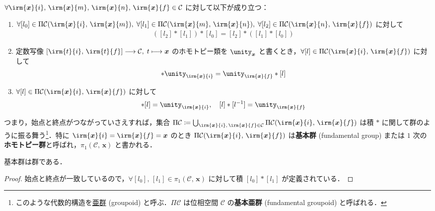 \documentclass[TQFT_main]{subfiles}
\begin{document}
\begin{mylem}[label=lem:1-1groupoid]{}
    $\forall \irm{\bm{x}}{i},\, \irm{\bm{x}}{m},\, \irm{\bm{x}}{n},\, \irm{\bm{x}}{f} \in \mathcal{C}$ に対して以下が成り立つ：
    \begin{enumerate}
        \item $\forall [l_0]\in \Pi \mathcal{C} (\irm{\bm{x}}{i},\, \irm{\bm{x}}{m}),\; \forall [l_1] \in \Pi \mathcal{C} (\irm{\bm{x}}{m},\, \irm{\bm{x}}{n}),\; \forall [l_2] \in \Pi \mathcal{C} (\irm{\bm{x}}{n},\, \irm{\bm{x}}{f})$ に対して
        \begin{align}
            ([l_2] * [l_1]) * [l_0] = [l_2] * ([l_1] * [l_0])
        \end{align}
        \item 定数写像 $[\irm{t}{i},\, \irm{t}{f}] \lto \mathcal{C},\; t \lmto \bm{x}$ のホモトピー類を $\unity_{\bm{x}}$ と書くとき，$\forall [l] \in \Pi \mathcal{C} (\irm{\bm{x}}{i},\, \irm{\bm{x}}{f})$ に対して
        \begin{align}
            [l] * \unity_{\irm{\bm{x}}{i}} = \unity_{\irm{\bm{x}}{f}} * [l]
        \end{align}
        \item $\forall [l] \in \Pi \mathcal{C} (\irm{\bm{x}}{i},\, \irm{\bm{x}}{f})$ に対して
        \begin{align}
            [l^{-1}] * [l] = \unity_{\irm{\bm{x}}{i}},\quad [l] * [l^{-1}] = \unity_{\irm{\bm{x}}{f}}
        \end{align}
    \end{enumerate}
\end{mylem}
つまり，始点と終点がつながっていさえすれば，集合 $\Pi \mathcal{C} \coloneqq \bigcup_{\irm{\bm{x}}{{i}},\, \irm{\bm{x}}{{f}} \in \mathcal{C}}\Pi \mathcal{C}(\irm{\bm{x}}{{i}},\, \irm{\bm{x}}{{f}})$ は積 $*$ に関して群のように振る舞う\footnote{このような代数的構造を\hyperref[def:groupoid]{亜群} (groupoid) と呼ぶ．$\Pi \mathcal{C}$ は位相空間 $\mathcal{C}$ の\textbf{基本亜群} (fundamental groupoid) と呼ばれる．}．特に $\irm{\bm{x}}{i} = \irm{\bm{x}}{f} = \bm{x}$ のとき $\Pi \mathcal{C}(\irm{\bm{x}}{i},\, \irm{\bm{x}}{f})$ は\textbf{基本群} (fundamental group) または $1$ 次の\textbf{ホモトピー群}と呼ばれ，$\pi_1 (\mathcal{C},\, \bm{x})$ と書かれる．

\begin{mylem}[]{}
    基本群は群である．
\end{mylem}

\begin{proof}
    始点と終点が一致しているので，$\forall [l_0],\, [l_1] \in \pi_1 (\mathcal{C},\, \bm{x})$ に対して積 $[l_0] * [l_1]$ が定義されている．
\end{proof}
\end{document}
